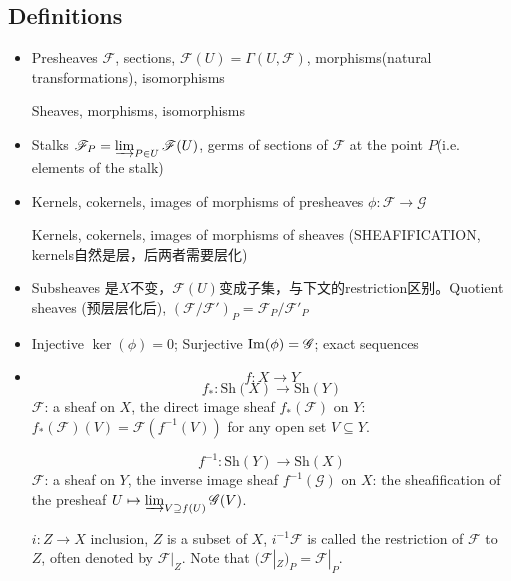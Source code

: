 \subsection*{Definitions} 
	\begin{itemize}
	\item Presheaves $\mathcal{F}$, sections, $\mathcal{F}(U)=\Gamma(U,\mathcal{F})$, morphisms(natural transformations), isomorphisms
	
	Sheaves, morphisms, isomorphisms 
	\item Stalks {\color{red} $\mathcal{F}_P =\varinjlim_{P\in U}\mathcal{F}(U)$}, germs of sections of $\mathcal{F}$ at the point $P$(i.e. elements of the stalk)
	\item Kernels, cokernels, images of morphisms of presheaves $\phi \colon \mathcal{F} \longrightarrow \mathcal{G}$

    Kernels, cokernels, images of morphisms of sheaves (SHEAFIFICATION, {\color{red}kernels自然是层}，后两者需要层化) 
	\item Subsheaves 是$X$不变，$\mathcal{F}(U)$变成子集，与下文的restriction区别。Quotient sheaves (预层层化后), {\color{red}$(\mathcal{F}/\mathcal{F'})_P=\mathcal{F}_P/\mathcal{F'}_P$} 
	\item Injective $\ker(\phi)=0$; Surjective $\mathrm{Im}(\phi)=\mathcal{G}$; exact sequences 
	\item $$f\colon X\longrightarrow Y$$
\[f_*\colon \mathrm{Sh}(X)\longrightarrow \mathrm{Sh}(Y)\]
$\mathcal{F}$: a sheaf on $X$, the direct image sheaf $f_*(\mathcal{F})$ on $Y$: {\color{red}$f_*(\mathcal{F})(V) = \mathcal{F}(f^{-1}(V))$} for any open set $V \subseteq Y$. 

\[f^{-1}\colon \mathrm{Sh}(Y)\longrightarrow \mathrm{Sh}(X)\]
$\mathcal{F}$: a sheaf on $Y$, the inverse image sheaf $f^{-1}(\mathcal{G})$ on $X$: the sheafification of the presheaf {\color{red}$U\mapsto \varinjlim_{V\supseteq f(U)}\mathcal{G}(V)$}.


$i\colon Z\longrightarrow X$ inclusion, $Z$ is a subset of $X$, $i^{-1}\mathcal{F}$ is called the restriction of $\mathcal{F}$ to $Z$, often denoted by $\mathcal{F}|_Z$. Note that $(\mathcal{F}|_Z)_P =\mathcal{F}|_P.$
\end{itemize}

